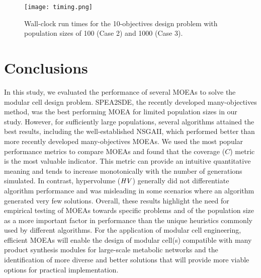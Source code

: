 {\begin{figure}[H]
    \centering
    \texttt{[image: timing.png]}
    \caption[Wall-clock run times]{Wall-clock run times for the 10-objectives design problem with population sizes of 100 (Case 2) and 1000 (Case 3).}
\label{fig4:timing}
\end{figure}


\section{Conclusions}
In this study, we evaluated the performance of several MOEAs to solve the modular cell design problem. SPEA2SDE, the recently developed many-objectives method, was the best performing MOEA for limited population sizes in our study. However, for sufficiently large populations, several algorithms attained the best results, including the well-established NSGAII, which performed better than more recently developed many-objectives MOEAs. We used the most popular performance metrics to compare MOEAs and found that the coverage ($C$) metric is the most valuable indicator. This metric can provide an intuitive quantitative meaning and tends to increase monotonically with the number of generations simulated. In contrast, hypervolume ($\mathit{HV}$) generally did not differentiate algorithm performance and was misleading in some scenarios where an algorithm generated very few solutions. Overall, these results highlight the need for empirical testing of MOEAs towards specific problems and of the population size as a more important factor in performance than the unique heuristics commonly used by different algorithms.
For the application of modular cell engineering, efficient MOEAs will enable the design of modular cell(s) compatible with many product synthesis modules for large-scale metabolic networks and the identification of more diverse and better solutions that will provide more viable options for practical implementation.








}
